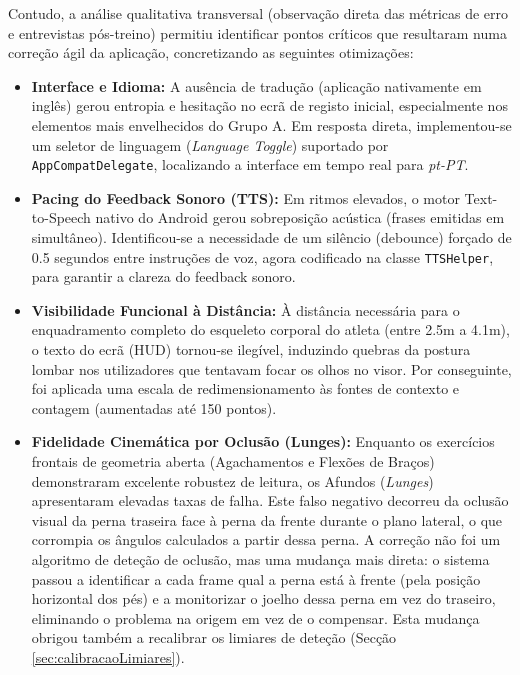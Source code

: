 Contudo, a análise qualitativa transversal (observação direta das métricas de erro e entrevistas pós-treino) permitiu identificar pontos críticos que resultaram numa correção ágil da aplicação, concretizando as seguintes otimizações:
\begin{itemize}
    \item \textbf{Interface e Idioma:} A ausência de tradução (aplicação nativamente em inglês) gerou entropia e hesitação no ecrã de registo inicial, especialmente nos elementos mais envelhecidos do Grupo A. Em resposta direta, implementou-se um seletor de linguagem (\textit{Language Toggle}) suportado por \texttt{AppCompatDelegate}, localizando a interface em tempo real para \textit{pt-PT}.
    \item \textbf{Pacing do Feedback Sonoro (TTS):} Em ritmos elevados, o motor Text-to-Speech nativo do Android gerou sobreposição acústica (frases emitidas em simultâneo). Identificou-se a necessidade de um silêncio (debounce) forçado de 0.5 segundos entre instruções de voz, agora codificado na classe \texttt{TTSHelper}, para garantir a clareza do feedback sonoro.
    \item \textbf{Visibilidade Funcional à Distância:} À distância necessária para o enquadramento completo do esqueleto corporal do atleta (entre 2.5m a 4.1m), o texto do ecrã (HUD) tornou-se ilegível, induzindo quebras da postura lombar nos utilizadores que tentavam focar os olhos no visor. Por conseguinte, foi aplicada uma escala de redimensionamento às fontes de contexto e contagem (aumentadas até 150 pontos).
    \item \textbf{Fidelidade Cinemática por Oclusão (Lunges):} Enquanto os exercícios frontais de geometria aberta (Agachamentos e Flexões de Braços) demonstraram excelente robustez de leitura, os Afundos (\textit{Lunges}) apresentaram elevadas taxas de falha. Este falso negativo decorreu da oclusão visual da perna traseira face à perna da frente durante o plano lateral, o que corrompia os ângulos calculados a partir dessa perna. A correção não foi um algoritmo de deteção de oclusão, mas uma mudança mais direta: o sistema passou a identificar a cada frame qual a perna está à frente (pela posição horizontal dos pés) e a monitorizar o joelho dessa perna em vez do traseiro, eliminando o problema na origem em vez de o compensar. Esta mudança obrigou também a recalibrar os limiares de deteção (Secção \ref{sec:calibracaoLimiares}).
\end{itemize}

